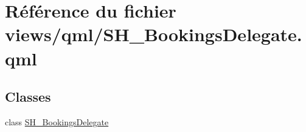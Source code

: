 \hypertarget{SH__BookingsDelegate_8qml}{\section{Référence du fichier views/qml/\-S\-H\-\_\-\-Bookings\-Delegate.qml}
\label{SH__BookingsDelegate_8qml}
}
\subsection*{Classes}
\begin{DoxyCompactItemize}
\item 
class \hyperlink{classSH__BookingsDelegate}{S\-H\-\_\-\-Bookings\-Delegate}
\end{DoxyCompactItemize}
